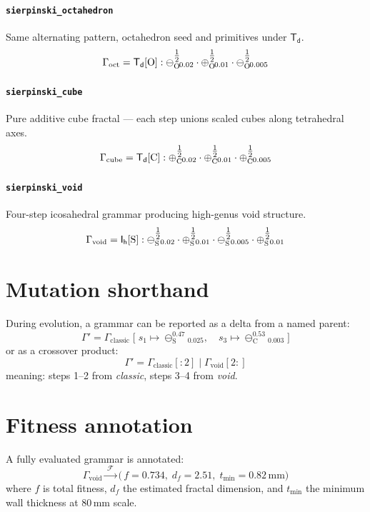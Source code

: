 \documentclass[11pt, a4paper]{article}
\newcommand{\G}[1]{\mathsf{#1}}          %
\newcommand{\prim}[1]{\mathrm{#1}}       %
\newcommand{\sub}{\ominus}               %
\newcommand{\add}{\oplus}                %
\begin{document}
\paragraph{\texttt{sierpinski\_octahedron}}
Same alternating pattern, octahedron seed and primitives under $\G{T_d}$.
\[
  \Gamma_{\mathrm{oct}}
  = \G{T_d}[\prim{O}]
  : \sub_{\prim{O}}^{\half}{}_{\!0.02}
  \cdot \add_{\prim{O}}^{\half}{}_{\!0.01}
  \cdot \sub_{\prim{O}}^{\half}{}_{\!0.005}
\]

\paragraph{\texttt{sierpinski\_cube}}
Pure additive cube fractal — each step unions scaled cubes
along tetrahedral axes.
\[
  \Gamma_{\mathrm{cube}}
  = \G{T_d}[\prim{C}]
  : \add_{\prim{C}}^{\half}{}_{\!0.02}
  \cdot \add_{\prim{C}}^{\half}{}_{\!0.01}
  \cdot \add_{\prim{C}}^{\half}{}_{\!0.005}
\]

\paragraph{\texttt{sierpinski\_void}}
Four-step icosahedral grammar producing high-genus void structure.
\[
  \Gamma_{\mathrm{void}}
  = \G{I_h}[\prim{S}]
  : \sub_{\prim{S}}^{\half}{}_{\!0.02}
  \cdot \add_{\prim{S}}^{\half}{}_{\!0.01}
  \cdot \sub_{\prim{S}}^{\half}{}_{\!0.005}
  \cdot \add_{\prim{S}}^{\half}{}_{\!0.01}
\]

\section*{Mutation shorthand}

During evolution, a grammar can be reported as a delta from a named parent:
\[
  \Gamma' = \Gamma_{\mathrm{classic}}
  \;\Big[\;
    s_1 \mapsto \sub_{\prim{S}}^{0.47}{}_{\!0.025},\quad
    s_3 \mapsto \sub_{\prim{C}}^{0.53}{}_{\!0.003}
  \;\Big]
\]
or as a crossover product:
\[
  \Gamma' = \Gamma_{\mathrm{classic}}[{:}2] \mathbin{|} \Gamma_{\mathrm{void}}[2{:}]
\]
meaning: steps 1–2 from \emph{classic}, steps 3–4 from \emph{void}.

\section*{Fitness annotation}

A fully evaluated grammar is annotated:
\[
  \Gamma_{\mathrm{void}} \xrightarrow{\;\mathcal{F}\;}
  \bigl(\,f = 0.734,\; d_f = 2.51,\; t_{\min} = 0.82\,\mathrm{mm}\bigr)
\]
where $f$ is total fitness, $d_f$ the estimated fractal dimension,
and $t_{\min}$ the minimum wall thickness at $80\,\mathrm{mm}$ scale.
\end{document}
